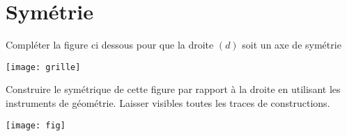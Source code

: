 \section{Symétrie}

\begin{questions}
	\question Compléter la figure ci dessous pour que la droite $(d)$ soit un axe de symétrie
	
	\begin{center}
		\texttt{[image: grille]}
	\end{center}

	\question Construire le symétrique de cette figure par rapport à la droite en utilisant les instruments de géométrie. Laisser visibles toutes les traces de constructions.
	
	\begin{center}
		\texttt{[image: fig]}
	\end{center}
		
\end{questions}